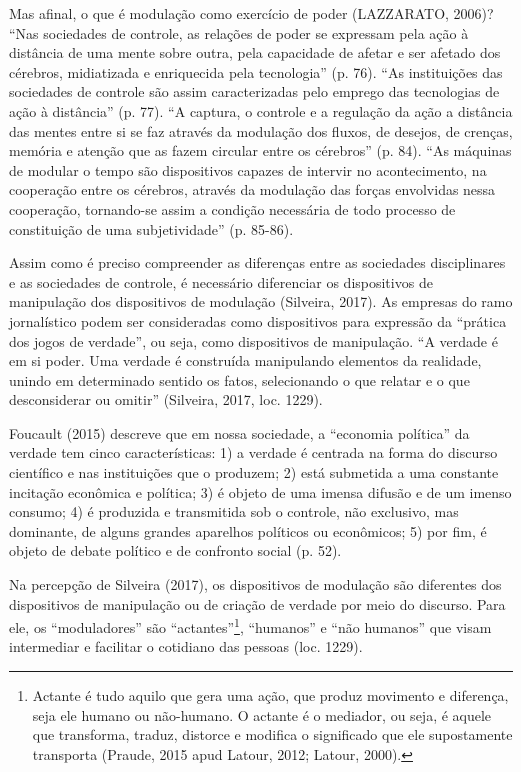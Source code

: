 Mas afinal, o que é modulação como exercício de poder (LAZZARATO, 2006)?
``Nas sociedades de controle, as relações de poder se expressam pela
ação à distância de uma mente sobre outra, pela capacidade de afetar e
ser afetado dos cérebros, midiatizada e enriquecida pela tecnologia''
(p. 76). ``As instituições das sociedades de controle são assim
caracterizadas pelo emprego das tecnologias de ação à distância'' (p.
77). ``A captura, o controle e a regulação da ação a distância das
mentes entre si se faz através da modulação dos fluxos, de desejos, de
crenças, memória e atenção que as fazem circular entre os cérebros'' (p.
84). ``As máquinas de modular o tempo são dispositivos capazes de
intervir no acontecimento, na cooperação entre os cérebros, através da
modulação das forças envolvidas nessa cooperação, tornando-se assim a
condição necessária de todo processo de constituição de uma
subjetividade'' (p. 85-86).

Assim como é preciso compreender as diferenças entre as sociedades
disciplinares e as sociedades de controle, é necessário diferenciar os
dispositivos de manipulação dos dispositivos de modulação (Silveira,
2017). As empresas do ramo jornalístico podem ser consideradas como
dispositivos para expressão da ``prática dos jogos de verdade'', ou
seja, como dispositivos de manipulação. ``A verdade é em si poder. Uma
verdade é construída manipulando elementos da realidade, unindo em
determinado sentido os fatos, selecionando o que relatar e o que
desconsiderar ou omitir'' (Silveira, 2017, loc. 1229).

Foucault (2015) descreve que em nossa sociedade, a ``economia política''
da verdade tem cinco características: 1) a verdade é centrada na forma
do discurso científico e nas instituições que o produzem; 2) está
submetida a uma constante incitação econômica e política; 3) é objeto de
uma imensa difusão e de um imenso consumo; 4) é produzida e transmitida
sob o controle, não exclusivo, mas dominante, de alguns grandes
aparelhos políticos ou econômicos; 5) por fim, é objeto de debate
político e de confronto social (p. 52).

Na percepção de Silveira (2017), os dispositivos de modulação são
diferentes dos dispositivos de manipulação ou de criação de verdade por
meio do discurso. Para ele, os ``moduladores'' são
``actantes''\footnote{Actante é tudo aquilo que gera uma ação, que
  produz movimento e diferença, seja ele humano ou não-humano. O actante
  é o mediador, ou seja, é aquele que transforma, traduz, distorce e
  modifica o significado que ele supostamente transporta (Praude, 2015
  apud Latour, 2012; Latour, 2000).}, ``humanos'' e ``não humanos'' que
visam intermediar e facilitar o cotidiano das pessoas (loc. 1229).

